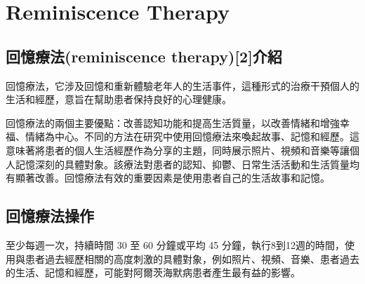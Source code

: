 \chapter{Reminiscence Therapy}
\label{chapter:intro}
\section{回憶療法(reminiscence therapy)[2]介紹}
回憶療法，它涉及回憶和重新體驗老年人的生活事件，這種形式的治療干預個人的生活和經歷，意旨在幫助患者保持良好的心理健康。

回憶療法的兩個主要優點：改善認知功能和提高生活質量，以改善情緒和增強幸福、情緒為中心。不同的方法在研究中使用回憶療法來喚起故事、記憶和經歷。這意味著將患者的個人生活經歷作為分享的主題，同時展示照片、視頻和音樂等讓個人記憶深刻的具體對象。該療法對患者的認知、抑鬱、日常生活活動和生活質量均有顯著改善。回憶療法有效的重要因素是使用患者自己的生活故事和記憶。

\section{回憶療法操作}
至少每週一次，持續時間 30 至 60 分鐘或平均 45 分鐘，執行8到12週的時間，使用與患者過去經歷相關的高度刺激的具體對象，例如照片、視頻、音樂、患者過去的生活、記憶和經歷，可能對阿爾茨海默病患者產生最有益的影響。

